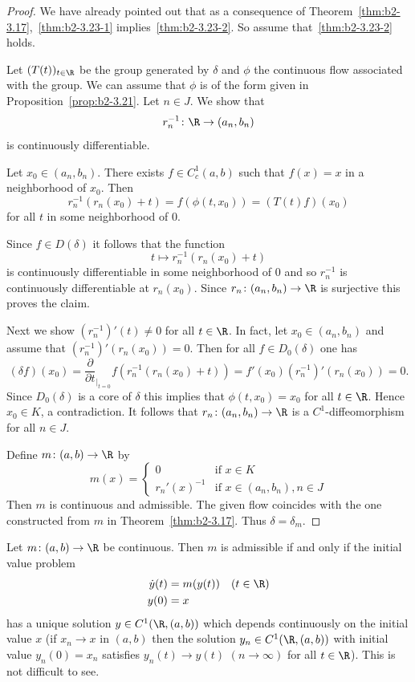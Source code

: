 \begin{proof}
We have already pointed out that as a consequence of Theorem~\ref{thm:b2-3.17},~\ref{thm:b2-3.23-1} implies~\ref{thm:b2-3.23-2}.
So assume that~\ref{thm:b2-3.23-2} holds.

Let $(T(t))_{t \in \R}$ be the group generated by $\delta$ and $\phi$ the continuous flow associated with the group.
We can assume that $\phi$ is of the form given in Proposition~\ref{prop:b2-3.21}.
Let $n \in J$.
We show that 
%
\[
	r_{n}^{-1} \colon \R \to (a_{n},b_{n})
\]
%
is continuously differentiable.

Let $x_{0} \in (a_{n},b_{n})$.
There exists $f \in C_{c}^{1}(a,b)$ such that $f(x) = x$ in a neighborhood of\/ $x_{0}$.
Then 
%
\[
	r_{n}^{-1}(r_{n}(x_{0}) + t) = f(\phi(t,x_{0})) = (T(t)f)(x_{0})
\]
%
for all $t$ in some neighborhood of\/ $0$.

Since $f \in D(\delta)$ it follows that the function 
%
\[
	t \mapsto r_{n}^{-1}(r_{n}(x_{0}) + t)
\]
%
is continuously differentiable in some neighborhood of\/ $0$ and so $r_{n}^{-1}$ is continuously differentiable at $r_{n}(x_{0})$.
Since $r_{n} \colon (a_{n},b_{n}) \to \R$ is surjective this proves the claim.

Next we show $(r_{n}^{-1})'(t) \neq 0$ for all $t \in \R$.
In fact, let $x_{0} \in (a_{n},b_{n})$ and assume that $(r_{n}^{-1})'(r_{n}(x_{0})) = 0$.
Then for all $f \in D_{0}(\delta)$ one has 
\[
(\delta f)(x_{0}) = \frac{\partial}{\partial t}_{|_{t=0}} f(r_{n}^{-1}(r_{n}(x_{0}) + t)) = f'(x_{0})(r_{n}^{-1})'(r_{n}(x_{0})) = 0.
\]
Since $D_{0}(\delta)$ is a core of\/ $\delta$ this implies that $\phi(t,x_{0}) = x_{0}$ for all $t \in \R$.
Hence $x_{0} \in K$, a contradiction.
It follows that $r_{n} \colon (a_{n},b_{n}) \to \R$ is a $C^{1}$-diffeomorphism for all $n \in J$.

Define $m \colon (a,b) \to \R$ by
\begin{equation*}\label{eq:b2-m-def}
m(x) = \begin{cases}
    0 & \text{if } x \in K \\
    r_{n}'(x)^{-1} & \text{if } x \in (a_{n},b_{n}), n \in J
\end{cases}
\end{equation*}
Then $m$ is continuous and admissible.
The given flow coincides with the one constructed from $m$ in Theorem~\ref{thm:b2-3.17}.
Thus $\delta = \delta_{m}$.
\end{proof}
\begin{remark*}\label{rem:b2-3.24}
%
Let $m \colon (a,b) \to \R$ be continuous.
Then $m$ is admissible if and only if the initial value problem
\begin{align*}
\dot{y}(t) &= m(y(t)) \quad (t \in \R) \\
y(0) &= x
\end{align*}
has a unique solution $y \in C^{1}(\R,(a,b))$ which depends continuously on the initial value $x$ (\ie  if\/ $x_{n} \to x$ in $(a,b)$ then the solution $y_{n} \in C^{1}(\R,(a,b))$ with initial value $y_{n}(0) = x_{n}$ satisfies $y_{n}(t) \to y(t)$ $(n \to \infty)$ for all $t \in \R$).
This is not difficult to see.
\end{remark*}
